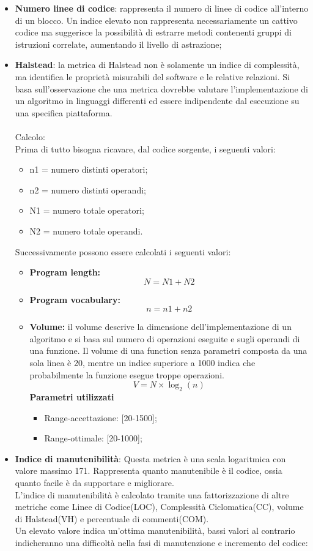 {{\begin{itemize}
		\item \textbf{Numero linee di codice}: rappresenta il numero di linee di codice all'interno di un blocco. 
		Un indice elevato non rappresenta necessariamente un cattivo codice ma suggerisce la possibilità di estrarre metodi contenenti gruppi di istruzioni correlate, aumentando il livello di astrazione;
		
		\item \textbf{Halstead}: la metrica di Halstead non è solamente un indice di complessità, ma identifica le proprietà misurabili del software e le relative relazioni. Si basa sull’osservazione che una metrica dovrebbe	valutare l’implementazione di un algoritmo in linguaggi differenti ed essere indipendente dal esecuzione su una specifica piattaforma.\\\\
		Calcolo:\\
		Prima di tutto bisogna ricavare, dal codice sorgente, i seguenti valori:
		\begin{itemize}		
		\item n1 = numero distinti operatori;
		\item n2 = numero distinti operandi;
		\item N1 = numero totale operatori;
		\item N2 = numero totale operandi.
		
	    \end{itemize}
	    Successivamente possono essere calcolati i seguenti valori:
	    \begin{itemize}
		\item \textbf{Program length:} \[N = N1 + N2\]
		\item \textbf{Program vocabulary:} \[n = n1 + n2\]
	    \item \textbf{Volume:} il volume descrive la dimensione dell’implementazione di un algoritmo e si basa sul numero di operazioni eseguite e sugli operandi di una funzione. Il volume di una function senza parametri composta da una sola linea è 20, mentre un indice superiore a 1000 indica che probabilmente la funzione esegue troppe operazioni. \[V= N \times \log_2(n)\]
	      \textbf{Parametri utilizzati}
	      \begin{itemize}
	       \item Range-accettazione: [20-1500];
	       \item Range-ottimale: [20-1000];
	      \end{itemize}
		\end{itemize}
		\item \textbf{Indice di manutenibilità}: Questa metrica è una scala logaritmica con valore massimo 171. Rappresenta quanto manutenibile è il codice, ossia quanto facile è da supportare e migliorare.\\
		L'indice di manutenibilità è calcolato tramite una fattorizzazione di altre metriche come Linee di Codice(LOC), Complessità Ciclomatica(CC), volume di Halstead(VH) e percentuale di commenti(COM).\\
		Un elevato valore indica un'ottima manutenibilità, bassi valori al contrario indicheranno una difficoltà nella fasi di manutenzione e incremento del codice:
		

\end{itemize}}}
